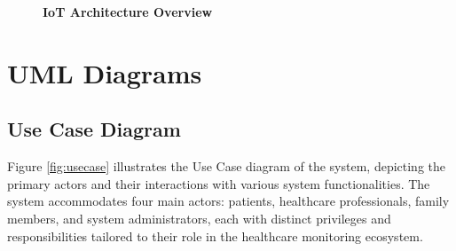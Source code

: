 \documentclass[12pt,a4paper]{article}
\begin{document}
\begin{figure}[H]
    \centering
    \caption{\textbf{IoT Architecture Overview}}
    \label{fig:architecture}
\end{figure}

\section{UML Diagrams}

\subsection{Use Case Diagram}

Figure \ref{fig:usecase} illustrates the Use Case diagram of the system, depicting the primary actors and their interactions with various system functionalities. The system accommodates four main actors: patients, healthcare professionals, family members, and system administrators, each with distinct privileges and responsibilities tailored to their role in the healthcare monitoring ecosystem.
\end{document}
